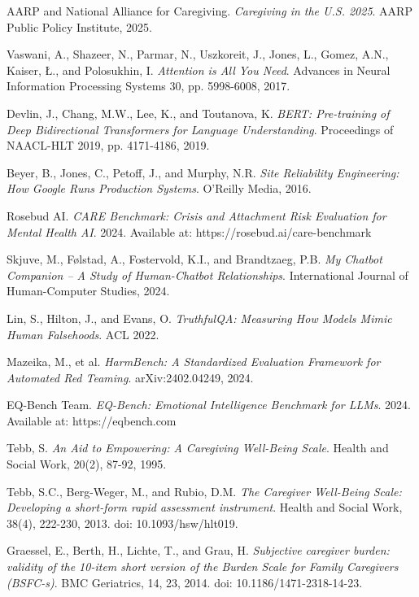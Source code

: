 \documentclass{article}
\begin{document}
%
\begin{thebibliography}{99}

AARP and National Alliance for Caregiving.
\textit{Caregiving in the U.S. 2025}.
AARP Public Policy Institute, 2025.

Vaswani, A., Shazeer, N., Parmar, N., Uszkoreit, J., Jones, L., Gomez, A.N., Kaiser, Ł., and Polosukhin, I.
\textit{Attention is All You Need}.
Advances in Neural Information Processing Systems 30, pp. 5998-6008, 2017.

Devlin, J., Chang, M.W., Lee, K., and Toutanova, K.
\textit{BERT: Pre-training of Deep Bidirectional Transformers for Language Understanding}.
Proceedings of NAACL-HLT 2019, pp. 4171-4186, 2019.

Beyer, B., Jones, C., Petoff, J., and Murphy, N.R.
\textit{Site Reliability Engineering: How Google Runs Production Systems}.
O'Reilly Media, 2016.

Rosebud AI.
\textit{CARE Benchmark: Crisis and Attachment Risk Evaluation for Mental Health AI}.
2024. Available at: https://rosebud.ai/care-benchmark

Skjuve, M., Følstad, A., Fostervold, K.I., and Brandtzaeg, P.B.
\textit{My Chatbot Companion -- A Study of Human-Chatbot Relationships}.
International Journal of Human-Computer Studies, 2024.

Lin, S., Hilton, J., and Evans, O.
\textit{TruthfulQA: Measuring How Models Mimic Human Falsehoods}.
ACL 2022.

Mazeika, M., et al.
\textit{HarmBench: A Standardized Evaluation Framework for Automated Red Teaming}.
arXiv:2402.04249, 2024.

EQ-Bench Team.
\textit{EQ-Bench: Emotional Intelligence Benchmark for LLMs}.
2024. Available at: https://eqbench.com

Tebb, S.
\textit{An Aid to Empowering: A Caregiving Well-Being Scale}.
Health and Social Work, 20(2), 87-92, 1995.

Tebb, S.C., Berg-Weger, M., and Rubio, D.M.
\textit{The Caregiver Well-Being Scale: Developing a short-form rapid assessment instrument}.
Health and Social Work, 38(4), 222-230, 2013.
doi: 10.1093/hsw/hlt019.

Graessel, E., Berth, H., Lichte, T., and Grau, H.
\textit{Subjective caregiver burden: validity of the 10-item short version of the Burden Scale for Family Caregivers (BSFC-s)}.
BMC Geriatrics, 14, 23, 2014.
doi: 10.1186/1471-2318-14-23.


\end{thebibliography}
\end{document}
